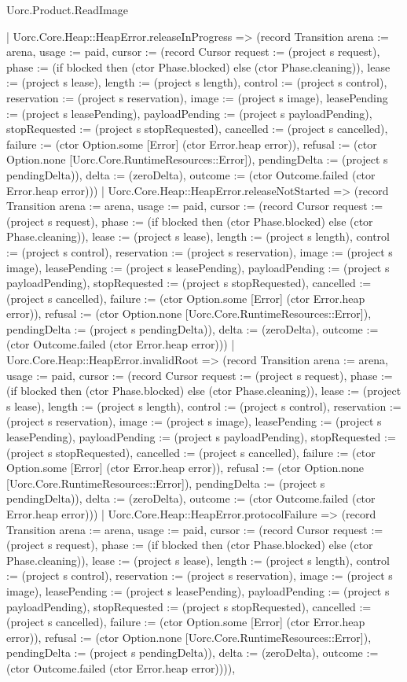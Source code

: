 \begin{lexlean}{Uorc.Product.ReadImage}
\begin{semanticmodule}
{    | Uorc.Core.Heap::HeapError.releaseInProgress => (record Transition {arena := arena, usage := paid, cursor := (record Cursor {request := (project s request), phase := (if blocked then (ctor Phase.blocked) else (ctor Phase.cleaning)), lease := (project s lease), length := (project s length), control := (project s control), reservation := (project s reservation), image := (project s image), leasePending := (project s leasePending), payloadPending := (project s payloadPending), stopRequested := (project s stopRequested), cancelled := (project s cancelled), failure := (ctor Option.some [Error] (ctor Error.heap error)), refusal := (ctor Option.none [Uorc.Core.RuntimeResources::Error]), pendingDelta := (project s pendingDelta)}), delta := (zeroDelta), outcome := (ctor Outcome.failed (ctor Error.heap error))})
    | Uorc.Core.Heap::HeapError.releaseNotStarted => (record Transition {arena := arena, usage := paid, cursor := (record Cursor {request := (project s request), phase := (if blocked then (ctor Phase.blocked) else (ctor Phase.cleaning)), lease := (project s lease), length := (project s length), control := (project s control), reservation := (project s reservation), image := (project s image), leasePending := (project s leasePending), payloadPending := (project s payloadPending), stopRequested := (project s stopRequested), cancelled := (project s cancelled), failure := (ctor Option.some [Error] (ctor Error.heap error)), refusal := (ctor Option.none [Uorc.Core.RuntimeResources::Error]), pendingDelta := (project s pendingDelta)}), delta := (zeroDelta), outcome := (ctor Outcome.failed (ctor Error.heap error))})
    | Uorc.Core.Heap::HeapError.invalidRoot => (record Transition {arena := arena, usage := paid, cursor := (record Cursor {request := (project s request), phase := (if blocked then (ctor Phase.blocked) else (ctor Phase.cleaning)), lease := (project s lease), length := (project s length), control := (project s control), reservation := (project s reservation), image := (project s image), leasePending := (project s leasePending), payloadPending := (project s payloadPending), stopRequested := (project s stopRequested), cancelled := (project s cancelled), failure := (ctor Option.some [Error] (ctor Error.heap error)), refusal := (ctor Option.none [Uorc.Core.RuntimeResources::Error]), pendingDelta := (project s pendingDelta)}), delta := (zeroDelta), outcome := (ctor Outcome.failed (ctor Error.heap error))})
    | Uorc.Core.Heap::HeapError.protocolFailure => (record Transition {arena := arena, usage := paid, cursor := (record Cursor {request := (project s request), phase := (if blocked then (ctor Phase.blocked) else (ctor Phase.cleaning)), lease := (project s lease), length := (project s length), control := (project s control), reservation := (project s reservation), image := (project s image), leasePending := (project s leasePending), payloadPending := (project s payloadPending), stopRequested := (project s stopRequested), cancelled := (project s cancelled), failure := (ctor Option.some [Error] (ctor Error.heap error)), refusal := (ctor Option.none [Uorc.Core.RuntimeResources::Error]), pendingDelta := (project s pendingDelta)}), delta := (zeroDelta), outcome := (ctor Outcome.failed (ctor Error.heap error))})),
}
\end{semanticmodule}
\end{lexlean}
